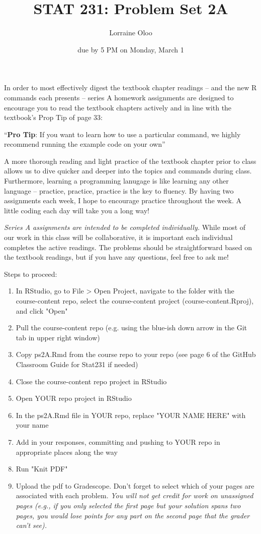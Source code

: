 \documentclass[
]{article}
\title{STAT 231: Problem Set 2A}
\author{Lorraine Oloo}
\date{due by 5 PM on Monday, March 1}
\begin{document}
\maketitle

In order to most effectively digest the textbook chapter readings -- and
the new R commands each presents -- series A homework assignments are
designed to encourage you to read the textbook chapters actively and in
line with the textbook's Prop Tip of page 33:

``\textbf{Pro Tip}: If you want to learn how to use a particular
command, we highly recommend running the example code on your own''

A more thorough reading and light practice of the textbook chapter prior
to class allows us to dive quicker and deeper into the topics and
commands during class. Furthermore, learning a programming lanugage is
like learning any other language -- practice, practice, practice is the
key to fluency. By having two assignments each week, I hope to encourage
practice throughout the week. A little coding each day will take you a
long way!

\emph{Series A assignments are intended to be completed individually.}
While most of our work in this class will be collaborative, it is
important each individual completes the active readings. The problems
should be straightforward based on the textbook readings, but if you
have any questions, feel free to ask me!

Steps to proceed:

\begin{enumerate}
\item In RStudio, go to File > Open Project, navigate to the folder with the course-content repo, select the course-content project (course-content.Rproj), and click "Open" 
\item Pull the course-content repo (e.g. using the blue-ish down arrow in the Git tab in upper right window)
\item Copy ps2A.Rmd from the course repo to your repo (see page 6 of the GitHub Classroom Guide for Stat231 if needed)
\item Close the course-content repo project in RStudio
\item Open YOUR repo project in RStudio
\item In the ps2A.Rmd file in YOUR repo, replace "YOUR NAME HERE" with your name
\item Add in your responses, committing and pushing to YOUR repo in appropriate places along the way
\item Run "Knit PDF" 
\item Upload the pdf to Gradescope.  Don't forget to select which of your pages are associated with each problem.  \textit{You will not get credit for work on unassigned pages (e.g., if you only selected the first page but your solution spans two pages, you would lose points for any part on the second page that the grader can't see).} 
\end{enumerate}
\end{document}
